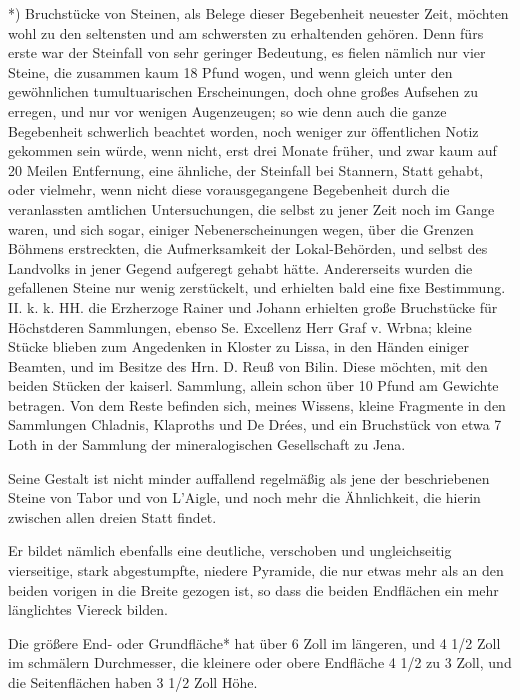 \documentclass[a4paper, 11pt, oneside, german]{article}
\begin{document}
*) Bruchstücke von Steinen, als Belege dieser Begebenheit neuester Zeit, möchten wohl zu den seltensten und am schwersten zu erhaltenden gehören. Denn fürs erste war der Steinfall von sehr geringer Bedeutung, es fielen nämlich nur vier Steine, die zusammen kaum 18 Pfund wogen, und wenn gleich unter den gewöhnlichen tumultuarischen Erscheinungen, doch ohne großes Aufsehen zu erregen, und nur vor wenigen Augenzeugen; so wie denn auch die ganze Begebenheit schwerlich beachtet worden, noch weniger zur öffentlichen Notiz gekommen sein würde, wenn nicht, erst drei Monate früher, und zwar kaum auf 20 Meilen Entfernung, eine ähnliche, der Steinfall bei Stannern, Statt gehabt, oder vielmehr, wenn nicht diese vorausgegangene Begebenheit durch die veranlassten amtlichen Untersuchungen, die selbst zu jener Zeit noch im Gange waren, und sich sogar, einiger Nebenerscheinungen wegen, über die Grenzen Böhmens erstreckten, die Aufmerksamkeit der Lokal-Behörden, und selbst des Landvolks in jener Gegend aufgeregt gehabt hätte. Andererseits wurden die gefallenen Steine nur wenig zerstückelt, und erhielten bald eine fixe Bestimmung. II. k. k. HH. die Erzherzoge Rainer und Johann erhielten große Bruchstücke für Höchstderen Sammlungen, ebenso Se. Excellenz Herr Graf v. Wrbna; kleine Stücke blieben zum Angedenken in Kloster zu Lissa, in den Händen einiger Beamten, und im Besitze des Hrn. D. Reuß von Bilin. Diese möchten, mit den beiden Stücken der kaiserl. Sammlung, allein schon über 10 Pfund am Gewichte betragen. Von dem Reste befinden sich, meines Wissens, kleine Fragmente in den Sammlungen Chladnis, Klaproths und De Drées, und ein Bruchstück von etwa 7 Loth in der Sammlung der mineralogischen Gesellschaft zu Jena.

Seine Gestalt ist nicht minder auffallend regelmäßig als jene der beschriebenen Steine von Tabor und von L'Aigle, und noch mehr die Ähnlichkeit, die hierin zwischen allen dreien Statt findet.

Er bildet nämlich ebenfalls eine deutliche, verschoben und ungleichseitig vierseitige, stark abgestumpfte, niedere Pyramide, die nur etwas mehr als an den beiden vorigen in die Breite gezogen ist, so dass die beiden Endflächen ein mehr länglichtes Viereck bilden.

Die größere End- oder Grundfläche* hat über 6 Zoll im längeren, und 4 1/2 Zoll im schmälern Durchmesser, die kleinere oder obere Endfläche 4 1/2 zu 3 Zoll, und die Seitenflächen haben 3 1/2 Zoll Höhe.
\end{document}
